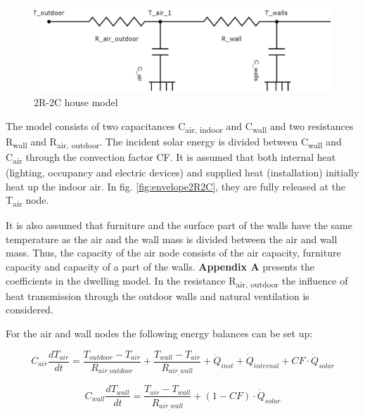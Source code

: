 \begin{figure}[H]
	\centering
	\includegraphics[width=1.0\columnwidth]{Pictures/2R2C_Model.png}
	\caption[Short title]{2R-2C house model}
	\label{fig:elec2R2C}
	\end{figure}
	
The model consists of two capacitances C\textsubscript{air, indoor} and C\textsubscript{wall} and two resistances R\textsubscript{wall} and R\textsubscript{air, outdoor}. The incident solar energy is divided between C\textsubscript{wall} and C\textsubscript{air} through the convection factor CF. It is assumed that both internal heat (lighting, occupancy and electric devices) and supplied heat (installation) initially heat up the indoor air. In fig. \ref{fig:envelope2R2C}, they are fully released at the T\textsubscript{air} node. 

 It is also assumed that furniture and the surface part of the walls have the same temperature as the air and the wall mass is divided between the air and wall mass. Thus, the capacity of the air node consists of the air capacity, furniture capacity and capacity of a part of the walls. \textbf{Appendix A} presents the coefficients in the dwelling model. In the resistance R\textsubscript{air, outdoor} the influence of heat transmission through the outdoor walls and natural ventilation is considered. 
 
For the air and wall nodes the following energy balances can be set up: 

\begin{equation}
C_{air}\frac{dT_{air}}{dt}=\frac{T_{outdoor}-T_{air}}{R_{air_{\_}outdoor}} + \frac{T_{wall}-T_{air}}{R_{air_{\_}wall}} + \dot{Q}_{inst} + \dot{Q}_{internal} + CF\cdot\dot{Q}_{solar}
\end{equation}

\begin{equation}
C_{wall}\frac{dT_{wall}}{dt}=\frac{T_{air}-T_{wall}}{R_{air_{\_}wall}} + (1-CF)\cdot\dot{Q}_{solar}
\end{equation}

